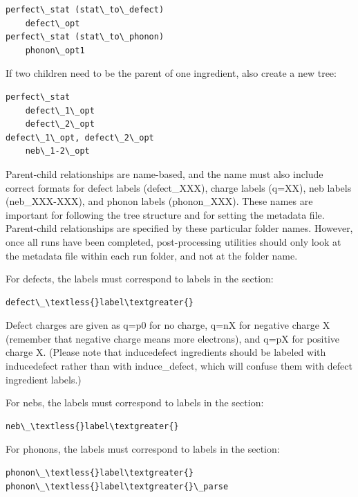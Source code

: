 \documentclass[letterpaper,10pt,english]{sphinxmanual}
\begin{document}
\begin{Verbatim}[commandchars=\\\{\}]
perfect\_stat (stat\_to\_defect)
    defect\_opt
perfect\_stat (stat\_to\_phonon)
    phonon\_opt1
\end{Verbatim}

If two children need to be the parent of one ingredient, also create a new tree:

\begin{Verbatim}[commandchars=\\\{\}]
perfect\_stat
    defect\_1\_opt
    defect\_2\_opt
defect\_1\_opt, defect\_2\_opt
    neb\_1-2\_opt
\end{Verbatim}

Parent-child relationships are name-based, and the name must also include correct formats for defect labels (defect\_XXX), charge labels (q=XX), neb labels (neb\_XXX-XXX), and phonon labels (phonon\_XXX). These names are important for following the tree structure and for setting the metadata file. Parent-child relationships are specified by these particular folder names. However, once all runs have been completed, post-processing utilities should only look at the metadata file within each run folder, and not at the folder name.

For defects, the labels must correspond to labels in the  section:

\begin{Verbatim}[commandchars=\\\{\}]
defect\_\textless{}label\textgreater{}
\end{Verbatim}

Defect charges are given as q=p0 for no charge, q=nX for negative charge X (remember that negative charge means more electrons), and q=pX for positive charge X.
(Please note that inducedefect ingredients should be labeled with inducedefect rather than with induce\_defect, which will confuse them with defect ingredient labels.)

For nebs, the labels must correspond to labels in the  section:

\begin{Verbatim}[commandchars=\\\{\}]
neb\_\textless{}label\textgreater{}
\end{Verbatim}

For phonons, the labels must correspond to labels in the  section:

\begin{Verbatim}[commandchars=\\\{\}]
phonon\_\textless{}label\textgreater{}
phonon\_\textless{}label\textgreater{}\_parse
\end{Verbatim}
\end{document}
